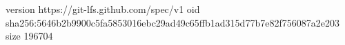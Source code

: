 version https://git-lfs.github.com/spec/v1
oid sha256:5646b2b9900c5fa5853016ebc29ad49c65ffb1ad315d77b7e82f756087a2e203
size 196704
